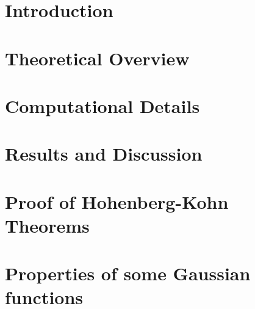 


    
    
    
    \chapter{Introduction}
    
    
    \chapter{Theoretical Overview}
    
    
    \chapter{Computational Details}
    
    
    \chapter{Results and Discussion}
    
    
    \newpage
    \thispagestyle{empty}
    \mbox{}
    \appendix
    \chapter{Proof of Hohenberg-Kohn Theorems}
    
    \chapter{Properties of some Gaussian functions}
    
    \nocite{ulrich,ulrich_1}
    \printbibliography
    

